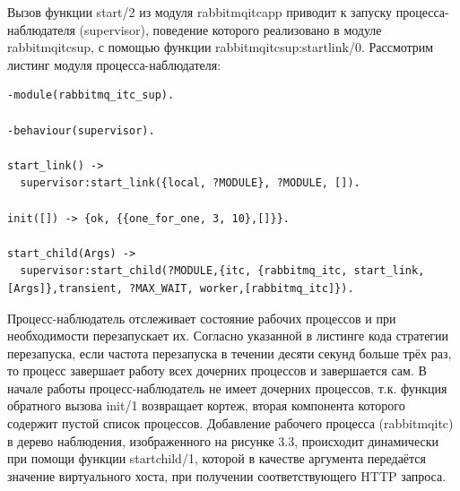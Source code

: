 Вызов функции start/2 из модуля rabbitmq\underline{\hspace{0.25cm}}itc\underline{\hspace{0.25cm}}app приводит к запуску процесса-наблюдателя (supervisor), поведение которого реализовано в модуле rabbitmq\underline{\hspace{0.25cm}}itc\underline{\hspace{0.25cm}}sup, с помощью функции rabbitmq\underline{\hspace{0.25cm}}itc\underline{\hspace{0.25cm}}sup:start\underline{\hspace{0.25cm}}link/0. Рассмотрим листинг модуля процесса-наблюдателя:
\begin{lstlisting}
-module(rabbitmq_itc_sup).

-behaviour(supervisor).

start_link() -> 
  supervisor:start_link({local, ?MODULE}, ?MODULE, []).

init([]) -> {ok, {{one_for_one, 3, 10},[]}}.

start_child(Args) ->
  supervisor:start_child(?MODULE,{itc, {rabbitmq_itc, start_link, [Args]},transient, ?MAX_WAIT, worker,[rabbitmq_itc]}).
\end{lstlisting}
Процесс-наблюдатель отслеживает состояние рабочих процессов и при необходимости перезапускает их. Согласно указанной в листинге кода стратегии перезапуска, если частота перезапуска в течении десяти секунд больше трёх раз, то процесс завершает работу всех дочерних процессов и завершается сам. В начале работы процесс-наблюдатель не имеет дочерних процессов, т.к. функция обратного вызова init/1 возвращает кортеж, вторая компонента которого содержит пустой список процессов. Добавление рабочего процесса (rabbitmq\underline{\hspace{0.25cm}}itc) в дерево наблюдения, изображенного на рисунке 3.3, происходит динамически при помощи функции  start\underline{\hspace{0.25cm}}child/1, которой в качестве аргумента передаётся значение виртуального хоста, при получении соответствующего HTTP запроса.\par
